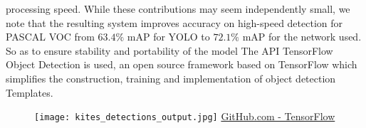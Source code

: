 processing speed. While these contributions may seem independently small, we
note that the resulting system improves accuracy on high-speed detection for
PASCAL VOC from $63.4\%$ mAP for YOLO to $72.1\%$ mAP for the network
used.\cite{liu2016ssd,Huang2016SpeedAccuracyTF}
So as to ensure stability and portability of the model The API TensorFlow Object
Detection is used, an open source framework based on TensorFlow which simplifies
the construction, training and implementation of object detection
Templates.\cite{objectdetectionAPI}
%
%
\begin{figure}[!h]
	\centering
	\texttt{[image: kites\_detections\_output.jpg]}
	{\href{https://github.com/tensorflow/models/tree/master/research/object_detection}{GitHub.com - TensorFlow}}
	\label{fig:kites-detections-output}
\end{figure}
%
%
